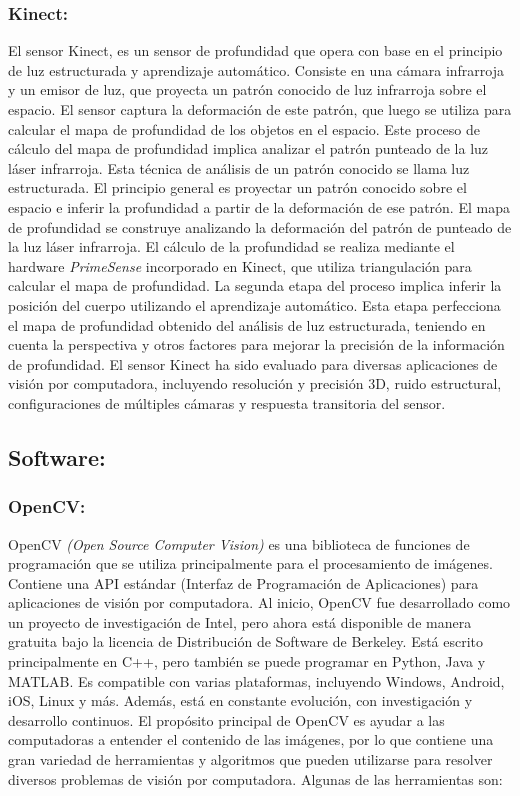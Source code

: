 \subsubsection*{Kinect:}

El sensor Kinect, es un sensor de profundidad que opera con base en el principio de luz estructurada y aprendizaje automático. Consiste en una cámara infrarroja y un emisor de luz, que proyecta un patrón conocido de luz infrarroja sobre el espacio. El sensor captura la deformación de este patrón, que luego se utiliza para calcular el mapa de profundidad de los objetos en el espacio. Este proceso de cálculo del mapa de profundidad implica analizar el patrón punteado de la luz láser infrarroja. Esta técnica de análisis de un patrón conocido se llama luz estructurada. El principio general es proyectar un patrón conocido sobre el espacio e inferir la profundidad a partir de la deformación de ese patrón. El mapa de profundidad se construye analizando la deformación del patrón de punteado de la luz láser infrarroja. El cálculo de la profundidad se realiza mediante el hardware \textit{PrimeSense} incorporado en Kinect, que utiliza triangulación para calcular el mapa de profundidad.
La segunda etapa del proceso implica inferir la posición del cuerpo utilizando el aprendizaje automático. Esta etapa perfecciona el mapa de profundidad obtenido del análisis de luz estructurada, teniendo en cuenta la perspectiva y otros factores para mejorar la precisión de la información de profundidad. El sensor Kinect ha sido evaluado para diversas aplicaciones de visión por computadora, incluyendo resolución y precisión 3D, ruido estructural, configuraciones de múltiples cámaras y respuesta transitoria del sensor. \cite{Andersen_2012}


\subsection*{Software:}
\subsubsection*{OpenCV:}
OpenCV \textit{(Open Source Computer Vision)} es una biblioteca de funciones de programación que se utiliza principalmente para el procesamiento de imágenes. Contiene una API estándar (Interfaz de Programación de Aplicaciones) para aplicaciones de visión por computadora. Al inicio, OpenCV fue desarrollado como un proyecto de investigación de Intel, pero ahora está disponible de manera gratuita bajo la licencia de Distribución de Software de Berkeley. Está escrito principalmente en C++, pero también se puede programar en Python, Java y MATLAB. Es compatible con varias plataformas, incluyendo Windows, Android, iOS, Linux y más. Además, está en constante evolución, con investigación y desarrollo continuos. El propósito principal de OpenCV es ayudar a las computadoras a entender el contenido de las imágenes, por lo que contiene una gran variedad de herramientas y algoritmos que pueden utilizarse para resolver diversos problemas de visión por computadora. Algunas de las herramientas son:

